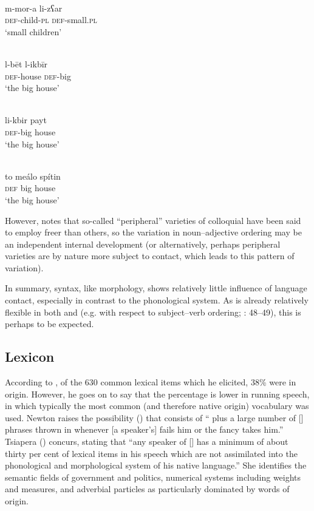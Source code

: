 \documentclass[output=paper]{langsci/langscibook}
\begin{document}
\ea\label{children}
\ea {}\\
\gll m-mor-a li-zʕar\\
     \textsc{def}-child-\textsc{pl} \textsc{def}-small.\textsc{pl}  \\
\glt ‘small children’

\ex
{}\\
\gll l-bēt l-ikbīr\\
     \textsc{def}-house \textsc{def}-big  \\
\glt ‘the big house’

\ex
{}\\
\gll li-kbir payt\\
     \textsc{def}-big house  \\
\glt ‘the big house’

\ex
{}\\
\gll to meálo spítin\\
     \textsc{def} big house  \\
\glt ‘the big house’
\z
\z

However, \citet{Borg2004} notes that so-called “peripheral” varieties of colloquial  have been said to employ freer  than others, so the variation in noun–adjective ordering may be an independent internal development (or alternatively, perhaps peripheral varieties are by nature more subject to contact, which leads to this pattern of variation).


In summary, syntax, like morphology, shows relatively little influence of language contact, especially in contrast to the phonological system. As  is already relatively flexible in both  and   (e.g. with respect to subject–verb ordering; \citealt{Newton1964}: 48–49), this is perhaps to be expected.

\subsection{Lexicon}

According to \citet{Newton1964}, of the 630 common lexical items which he elicited, 38\% were  in origin. However, he goes on to say that the percentage is lower in running speech, in which typically the most common (and therefore native  origin) vocabulary was used. Newton raises the possibility (\citeyear[51]{Newton1964}) that  consists of “ plus a large number of  [] phrases thrown in whenever [a speaker’s]  fails him or the fancy takes him.” Tsiapera (\citeyear[124]{Tsiapera1964}) concurs, stating that “any speaker of [] has a minimum of about thirty per cent of  lexical items in his speech which are not assimilated into the phonological and morphological system of his native language.” She identifies the semantic fields of government and politics, numerical systems including weights and measures, and adverbial particles as particularly dominated by words of  origin.
\end{document}
